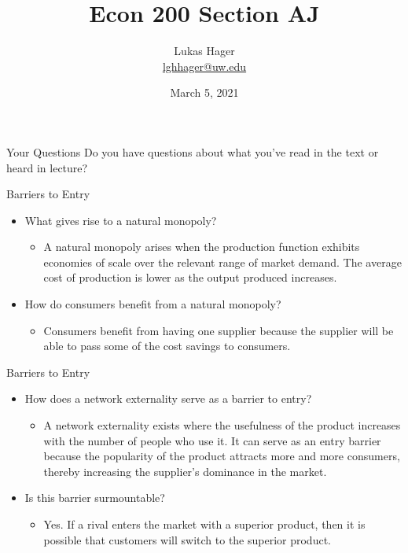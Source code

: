 \documentclass{beamer}
\title{Econ 200 Section AJ}
\author{Lukas Hager \\ \href{mailto:lghhager@uw.edu}{lghhager@uw.edu}}
\institute{Office Hours: Monday 8-9, Thursday 3:30-4:30}
\date{March 5, 2021}
\begin{document}
\begin{frame}
  \titlepage
\end{frame}


\begin{frame}{Your Questions}
    Do you have questions about what you've read in the text or heard in lecture?
\end{frame}

\begin{frame}{Barriers to Entry}
    \begin{itemize}
        \item What gives rise to a natural monopoly?
        \begin{itemize}
            \item A natural monopoly arises when the production function exhibits economies of scale over the relevant range of market demand. The average cost of production is lower as the output produced increases.
        \end{itemize}
        \item How do consumers benefit from a natural monopoly?
        \begin{itemize}
            \item Consumers benefit from having one supplier because the supplier will be able to pass some of the cost savings to consumers.
        \end{itemize}
    \end{itemize}
\end{frame}

\begin{frame}{Barriers to Entry}
    \begin{itemize}
        \item How does a network externality serve as a barrier to entry?
        \begin{itemize}
            \item A network externality exists where the usefulness of the product increases with the number of people who use it. It can serve as an entry barrier because the popularity of the product attracts more and more consumers, thereby increasing the supplier's dominance in the market.
        \end{itemize}
        \item Is this barrier surmountable?
        \begin{itemize}
            \item Yes. If a rival enters the market with a superior product, then it is possible that customers will switch to the superior product.
        \end{itemize}
    \end{itemize}
\end{frame}
\end{document}
